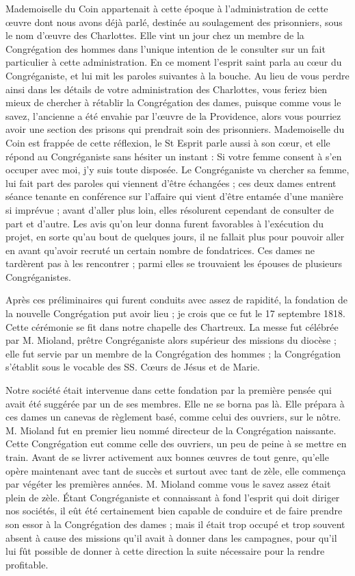 Mademoiselle du Coin appartenait à cette époque à l'administration de cette œuvre dont nous avons déjà parlé, destinée au soulagement des prisonniers, sous le nom d'œuvre des Charlottes. Elle vint un jour chez un membre de la Congrégation des hommes dans l'unique intention de le consulter sur un fait particulier à cette administration. En ce moment l'esprit saint parla au cœur du Congréganiste, et lui mit les paroles suivantes à la bouche. Au lieu de vous perdre ainsi dans les détails de votre administration des Charlottes, vous feriez bien mieux de chercher à rétablir la Congrégation
des dames, puisque comme vous le savez, l'ancienne a été envahie par l'œuvre de la Providence, alors vous pourriez avoir une section des prisons qui prendrait soin des prisonniers. Mademoiselle du Coin est frappée de cette réflexion, le St Esprit parle aussi à son cœur, et elle répond au Congréganiste sans hésiter un instant : Si votre femme consent à s'en occuper avec moi, j'y suis toute disposée. Le Congréganiste va chercher sa femme, lui fait part des paroles qui viennent d'être échangées ; ces deux dames entrent séance tenante en conférence sur l'affaire qui vient d'être entamée d'une manière si imprévue ; avant d'aller plus loin, elles résolurent cependant de consulter de part et d'autre. Les avis qu'on leur donna furent favorables à l'exécution du projet, en sorte qu'au bout de quelques jours, il ne fallait plus pour pouvoir aller en avant qu'avoir recruté un certain nombre de fondatrices. Ces dames ne tardèrent pas à les rencontrer ; parmi elles se trouvaient les épouses de plusieurs Congréganistes.

Après ces préliminaires qui furent conduits avec assez de rapidité, la fondation de la nouvelle Congrégation put avoir lieu ; je crois que ce fut le 17 septembre 1818. Cette cérémonie se fit dans notre chapelle des Chartreux. La messe fut célébrée par M. Mioland, prêtre Congréganiste alors supérieur des missions du diocèse ; elle fut servie par un membre de la Congrégation des hommes ; la Congrégation s'établit sous le vocable des SS. Cœurs de Jésus et de Marie.

Notre société était intervenue dans cette fondation par la première pensée qui avait été suggérée par un de ses membres. Elle ne se borna pas là. Elle prépara à ces dames
un canevas de règlement basé, comme celui des ouvriers, sur le nôtre. M. Mioland fut en premier lieu nommé directeur de la Congrégation naissante. Cette Congrégation eut comme celle des ouvriers, un peu de peine à se mettre en train. Avant de se livrer activement aux bonnes œuvres de tout genre, qu'elle opère maintenant avec tant de succès et surtout avec tant de zèle, elle commença par végéter les premières années. M. Mioland comme vous le savez assez était plein de zèle. Étant Congréganiste et connaissant à fond l'esprit qui doit diriger nos sociétés, il eût été certainement bien capable de conduire et de faire prendre son essor à la Congrégation des dames ; mais il était trop occupé et trop souvent absent à cause des missions qu'il avait à donner dans les campagnes, pour qu'il lui fût possible de donner à cette direction la suite nécessaire pour la rendre profitable.

